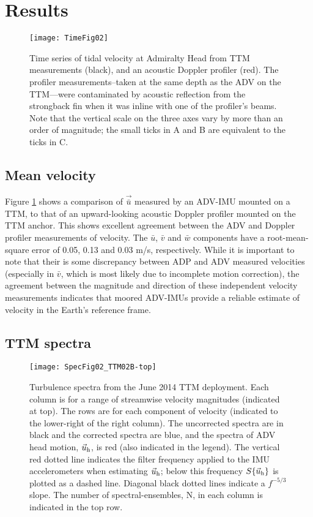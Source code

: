 \section{Results}

\begin{figure}[t]
  \centering
  \texttt{[image: TimeFig02]}
  \caption{Time series of tidal velocity at Admiralty Head from TTM measurements (black), and an acoustic Doppler profiler (red). The profiler measurements--taken at the same depth as the ADV on the TTM---were contaminated by acoustic reflection from the strongback fin when it was inline with one of the profiler's beams. Note that the vertical scale on the three axes vary by more than an order of magnitude; the small ticks in A and B are equivalent to the ticks in C.}
  \label{fig:vel_time}
\end{figure}

\subsection{Mean velocity}

Figure \ref{fig:vel_time} shows a comparison of $\vec{\bar u}$ measured by an ADV-IMU mounted on a TTM, to that of an upward-looking acoustic Doppler profiler mounted on the TTM anchor. This shows excellent agreement between the ADV and Doppler profiler measurements of velocity. The $\bar u$, $\bar v$ and $\bar w$ components have a root-mean-square error of 0.05, 0.13 and 0.03 m/s, respectively.
While it is important to note that their is some discrepancy between ADP and ADV measured velocities (especially in $\bar v$, which is most likely due to incomplete motion correction), the agreement between the magnitude and direction of these independent velocity measurements indicates that moored ADV-IMUs provide a reliable estimate of velocity in the Earth's reference frame.

\subsection{TTM spectra}

\begin{figure*}[t]
  \centering
  \texttt{[image: SpecFig02\_TTM02B-top]}
  \caption{Turbulence spectra from the June 2014 TTM deployment. Each column is for a range of streamwise velocity magnitudes (indicated at top). The rows are for each component of velocity (indicated to the lower-right of the right column). The uncorrected spectra are in black and the corrected spectra are blue, and the spectra of ADV head motion, $\vec{u}_\mathrm{h}$, is red (also indicated in the legend). The vertical red dotted line indicates the filter frequency applied to the IMU accelerometers when estimating $\vec{u}_\mathrm{h}$; below this frequency $S\{\vec{u}_\mathrm{h}\}$ is plotted as a dashed line.   Diagonal black dotted lines indicate a $f^{-5/3}$ slope. The number of spectral-ensembles, N, in each column is indicated in the top row.}
  \label{fig:spec:ttm}
\end{figure*}

